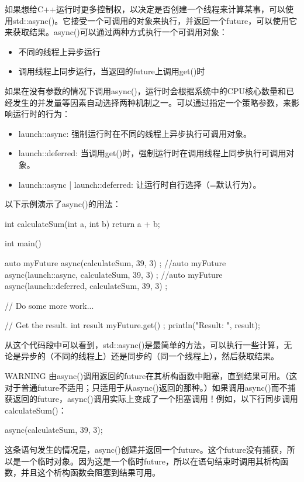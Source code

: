 
如果想给C++运行时更多控制权，以决定是否创建一个线程来计算某事，可以使用std::async()。它接受一个可调用的对象来执行，并返回一个future，可以使用它来获取结果。async()可以通过两种方式执行一个可调用对象：

\begin{itemize}
\item
不同的线程上异步运行

\item
调用线程上同步运行，当返回的future上调用get()时
\end{itemize}

如果在没有参数的情况下调用async()，运行时会根据系统中的CPU核心数量和已经发生的并发量等因素自动选择两种机制之一。可以通过指定一个策略参数，来影响运行时的行为：

\begin{itemize}
\item
launch::async: 强制运行时在不同的线程上异步执行可调用对象。

\item
launch::deferred: 当调用get()时，强制运行时在调用线程上同步执行可调用对象。

\item
launch::async | launch::deferred: 让运行时自行选择（=默认行为）。
\end{itemize}

以下示例演示了async()的用法：

\begin{cpp}
int calculateSum(int a, int b) { return a + b; }

int main()
{
    auto myFuture { async(calculateSum, 39, 3) };
    //auto myFuture { async(launch::async, calculateSum, 39, 3) };
    //auto myFuture { async(launch::deferred, calculateSum, 39, 3) };

    // Do some more work...

    // Get the result.
    int result { myFuture.get() };
    println("Result: {}", result);
}
\end{cpp}

从这个代码段中可以看到，std::async()是最简单的方法，可以执行一些计算，无论是异步的（不同的线程上）还是同步的（同一个线程上），然后获取结果。

\begin{myWarning}{WARNING}
由async()调用返回的future在其析构函数中阻塞，直到结果可用。（这对于普通future不适用；只适用于从async()返回的那种。）如果调用async()而不捕获返回的future，async()调用实际上变成了一个阻塞调用！例如，以下行同步调用calculateSum()：

\begin{cpp}
async(calculateSum, 39, 3);
\end{cpp}

这条语句发生的情况是，async()创建并返回一个future。这个future没有捕获，所以是一个临时对象。因为这是一个临时future，所以在语句结束时调用其析构函数，并且这个析构函数会阻塞到结果可用。
\end{myWarning}

